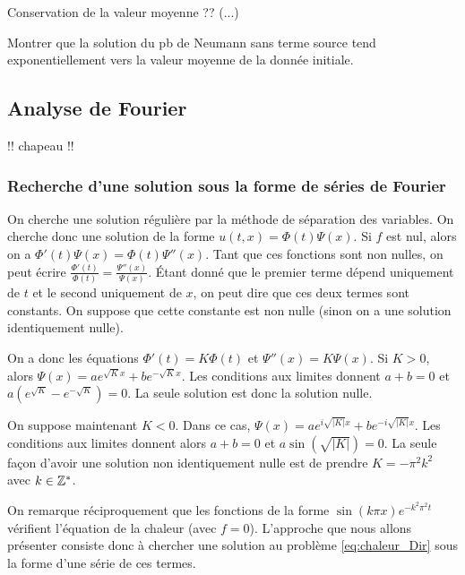 \documentclass[12pt,a4paper,twoside]{article}
\begin{document}
\begin{remark}
  Conservation de la valeur moyenne ??
  (...)
\end{remark}


\begin{exercise}
  Montrer que la solution du pb de Neumann sans terme source
  tend exponentiellement vers la valeur moyenne de la donn\'ee initiale.
\end{exercise}

\subsection{Analyse de Fourier}

!! chapeau !!

\subsubsection{Recherche d'une solution sous la forme de s\'eries de Fourier}

On cherche une solution r\'eguli\`ere par la m\'ethode de s\'eparation des variables.
On cherche donc une solution de la forme
$u(t,x) = \Phi(t) \Psi(x)$.
Si $f$ est nul, alors on a $\Phi'(t) \Psi(x) = \Phi(t) \Psi''(x)$.
Tant que ces fonctions sont non nulles, on peut \'ecrire
$\frac{\Phi'(t)}{\Phi(t)} = \frac{\Psi''(x)}{\Psi(x)}$.
\'Etant donn\'e que le premier terme d\'epend uniquement de $t$
et le second uniquement de $x$, on peut dire que ces deux termes sont constants.
On suppose que cette constante est non nulle (sinon on a une solution
identiquement nulle).


On a donc les \'equations
$\Phi'(t) = K \Phi(t)$ et $\Psi''(x) = K \Psi(x)$.
Si $K>0$, alors $\Psi(x) = a e^{\sqrt{K} x} + b e^{- \sqrt{K} x}$.
Les conditions aux limites donnent
$a+b=0$ et $a(e^{\sqrt{K}} - e^{-\sqrt{K}}) = 0$.
La seule solution est donc la solution nulle.


On suppose maintenant $K < 0$.
Dans ce cas, $\Psi(x) = a e^{i\sqrt{|K|} x} + b e^{- i\sqrt{|K|} x}$.
Les conditions aux limites donnent alors $a + b = 0$
et $a \sin(\sqrt{|K|}) = 0$.
La seule fa\c{c}on d'avoir une solution non identiquement nulle
est de prendre $K = - \pi^2 k^2$ avec $k \in \mathbb{Z}^*$.


On remarque r\'eciproquement
que les fonctions de la forme $\sin(k \pi x) e^{-k^2 \pi^2 t}$
v\'erifient l'\'equation de la chaleur (avec $f = 0$).
L'approche que nous allons pr\'esenter consiste donc \`a 
chercher une solution au probl\`eme \eqref{eq:chaleur_Dir} sous la forme
d'une s\'erie de ces termes.
\end{document}
